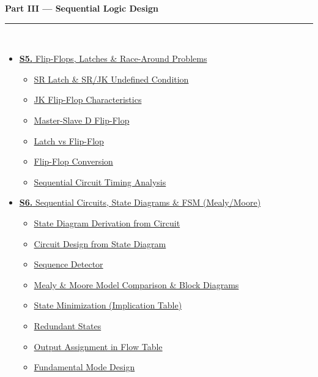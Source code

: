\documentclass[12pt,a4paper]{article}
\begin{document}
\begin{tcolorbox}[breakable,colback=cE!5,colframe=cE,boxrule=1pt,arc=5pt,
  left=8pt,right=8pt,top=8pt,bottom=8pt,before skip=4pt]
  {\large\bfseries\textcolor{cE}{Part III --- Sequential Logic Design}}\\[5pt]
  \textcolor{cE!40}{\rule{\textwidth}{0.4pt}}\\[3pt]
  \small\begin{itemize}[leftmargin=1.2em,itemsep=1pt,label={\textcolor{cE}{$\triangleright$}}]
    \item \hyperref[sec:S5]{\textbf{S5.} Flip-Flops, Latches \& Race-Around Problems}
      \begin{itemize}[leftmargin=1.5em,itemsep=0pt,label={\textcolor{cE}{$\cdot$}}]
        \item \hyperref[sub:s5-sr]{SR Latch \& SR/JK Undefined Condition}
        \item \hyperref[sub:s5-jk]{JK Flip-Flop Characteristics}
        \item \hyperref[sub:s5-master-slave]{Master-Slave D Flip-Flop}
        \item \hyperref[sub:s5-latch-ff]{Latch vs Flip-Flop}
        \item \hyperref[sub:s5-conversion]{Flip-Flop Conversion}
        \item \hyperref[sub:s5-timing]{Sequential Circuit Timing Analysis}
      \end{itemize}
    \item \hyperref[sec:S6]{\textbf{S6.} Sequential Circuits, State Diagrams \& FSM (Mealy/Moore)}
      \begin{itemize}[leftmargin=1.5em,itemsep=0pt,label={\textcolor{cE}{$\cdot$}}]
        \item \hyperref[sub:s6-state-derivation]{State Diagram Derivation from Circuit}
        \item \hyperref[sub:s6-circuit-design]{Circuit Design from State Diagram}
        \item \hyperref[sub:s6-sequence]{Sequence Detector}
        \item \hyperref[sub:s6-mealy-moore]{Mealy \& Moore Model Comparison \& Block Diagrams}
        \item \hyperref[sub:s6-state-min]{State Minimization (Implication Table)}
        \item \hyperref[sub:s6-redundant]{Redundant States}
        \item \hyperref[sub:s6-output-assign]{Output Assignment in Flow Table}
        \item \hyperref[sub:s6-fundamental]{Fundamental Mode Design}

\end{itemize}
\end{itemize}
\end{tcolorbox}
\end{document}
